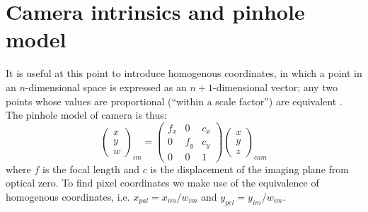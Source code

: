 \section{Camera intrinsics and pinhole model}
It is useful at this point to introduce homogenous coordinates, in which a point in an $n$-dimensional space is expressed as an $n+1$-dimensional vector; any two points whose values are proportional (``within a scale factor'') are equivalent \cite{Bradski:2008}.  The pinhole model of camera is thus: 
\begin{equation}
\begin{pmatrix}
x \\ y \\ w
\end{pmatrix}_{im}
=
\begin{pmatrix}
f_x & 0 & c_x \\
0 & f_y & c_y \\
0 & 0 & 1
\end{pmatrix}
\begin{pmatrix}
x \\ y \\ z
\end{pmatrix}_{cam}
\end{equation}
where $f$ is the focal length and $c$ is the displacement of the imaging plane from optical zero.  To find pixel coordinates we make use of the equivalence of homogenous coordinates, i.e. $x_{pal} = x_{im}/w_{im}$ and $y_{pel} = y_{im}/w_{im}$.

